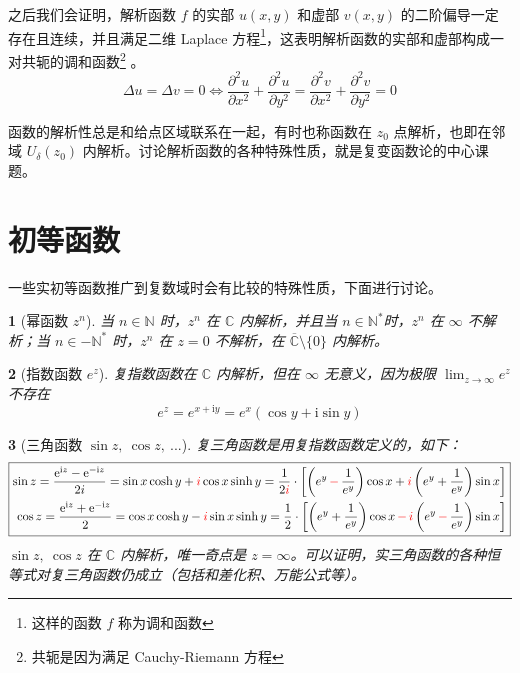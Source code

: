 \documentclass[UTF8]{report}
\def\N{\mathbb{N}}
\def\C{\mathbb{C}}
\theoremstyle{MyLineTheoremStyle} %
\theoremstyle{MyBlockTheoremStyle} %
\theoremstyle{MySubsubsectionStyle} %
\newtheorem{definition}{}
\begin{document}
    之后我们会证明，解析函数 $f$ 的实部 $u(x,y)$ 和虚部 $v(x,y)$ 的二阶偏导一定存在且连续，并且满足二维 Laplace 方程\footnote{这样的函数 $f$ 称为调和函数}，这表明解析函数的实部和虚部构成一对共轭的调和函数\footnote{共轭是因为满足 Cauchy-Riemann 方程}
    。
    \begin{equation}
        \Delta u = \Delta v = 0 \Longleftrightarrow
        \frac{\partial^{2}u}{\partial x^{2}}+\frac{\partial^{2}u}{\partial y^{2}}=\frac{\partial^{2}v}{\partial x^{2}}+\frac{\partial^{2}v}{\partial y^{2}}=0
    \end{equation}
    
    函数的解析性总是和给点区域联系在一起，有时也称函数在 $z_0$ 点解析，也即在邻域 $U_{\delta}(z_0)$ 内解析。讨论解析函数的各种特殊性质，就是复变函数论的中心课题。
    



\section{初等函数}

一些实初等函数推广到复数域时会有比较的特殊性质，下面进行讨论。



\begin{definition}[幂函数 $z^n$]
当 $n \in \N$ 时，$z^n$ 在 $\C$ 内解析，并且当 $n \in \N^*$时，$z^n$ 在 $\infty$ {\color{red} 不解析}；当 $n \in -\N^*$ 时，$z^n$ 在 $z=0$ {\color{red} 不解析}，在 $\overline{\C}\setminus \{0\}$ 内解析。
\end{definition}


\begin{definition}[指数函数 $e^z$]
复指数函数在 $\C$ 内解析，但在 $\infty$ 无意义，因为极限 $\lim_{z \to \infty}e^z$ 不存在
\begin{equation}
e^z = e^{x + \mathrm{i} y} = e^x(\cos y + \mathrm{i} \sin y)
\end{equation}
\end{definition}


\begin{definition}[三角函数 $\sin z,\ \cos z,\ ...$]
复三角函数是用复指数函数定义的，如下：
\begin{gather}
\boxed{
    \begin{aligned}
        \sin z
        =\frac{\mathrm{e}^{\mathrm{i}z}-\mathrm{e}^{-\mathrm{i}z}}{2i} 
        = \sin x \cosh y + {\color{red} i} \cos x \sinh y
        = \frac{1}{2{\color{red} i}}\cdot \left[ \left( e^y {\color{red} \,-\,} \frac{1}{e^y} \right)\cos x + {\color{red} i}\left( e^y +  \frac{1}{e^y}\right)\sin x \right]
        \\
        \cos z
        =\frac{\mathrm{e}^{\mathrm{i}z}+\mathrm{e}^{-\mathrm{i}z}}{2}
        = \cos x \cosh y - {\color{red} i} \sin x \sinh y
        = \frac{1}{2}\cdot \left[ \left(e^y + \frac{1}{e^y}  \right)\cos x {\color{red} \,- \,} {\color{red} i}\left( e^y {\color{red} \,-\,} \frac{1}{e^y} \right)\sin x \right]
    \end{aligned}
}
\end{gather}
$\sin z,\ \cos z$ 在 $\C$ 内解析，唯一奇点是 $z = \infty$。可以证明，实三角函数的各种恒等式对复三角函数仍成立（包括和差化积、万能公式等）。
\end{definition}
\end{document}
